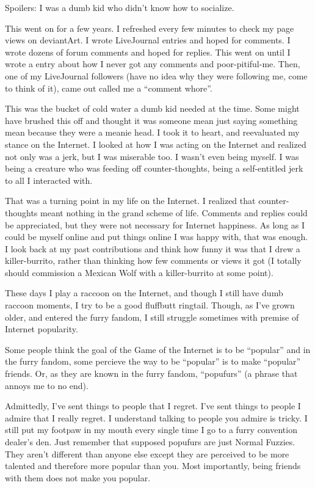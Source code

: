 Spoilers: I was a dumb kid who didn't know how to socialize.

This went on for a few years. I refreshed every few minutes to check my page views on deviantArt.  I wrote LiveJournal entries and hoped for comments. I wrote dozens of forum comments and hoped for replies. This went on until I wrote a entry about how I never got any comments and poor-pitiful-me. Then, one of my LiveJournal followers (have no idea why they were following me, come to think of it), came out called me a ``comment whore''.

This was the bucket of cold water a dumb kid needed at the time. Some might have brushed this off and thought it was someone mean just saying something mean because they were a meanie head. I took it to heart, and reevaluated my stance on the Internet. I looked at how I was acting on the Internet and realized not only was a jerk, but I was miserable too. I wasn't even being myself. I was being a creature who was feeding off counter-thoughts, being a self-entitled jerk to all I interacted with.

That was a turning point in my life on the Internet. I realized that counter-thoughts meant nothing in the grand scheme of life. Comments and replies could be appreciated, but they were not necessary for Internet happiness. As long as I could be myself online and put things online I was happy with, that was enough. I look back at my past contributions and think how funny it was that I drew a killer-burrito, rather than thinking how few comments or views it got (I totally should commission a Mexican Wolf with a killer-burrito at some point).

These days I play a raccoon on the Internet, and though I still have dumb raccoon moments, I try to be a good fluffbutt ringtail. Though, as I've grown older, and entered the furry fandom, I still struggle sometimes with premise of Internet popularity.

Some people think the goal of the Game of the Internet is to be ``popular'' and in the furry fandom, some percieve the way to be ``popular'' is to make ``popular'' friends. Or, as they are known in the furry fandom, ``popufurs'' (a phrase that annoys me to no end).

Admittedly, I've sent things to people that I regret. I've sent things to people I admire that I really regret. I understand talking to people you admire is tricky. I still put my footpaw in my mouth every single time I go to a furry convention dealer's den. Just remember that supposed popufurs are just Normal Fuzzies. They aren't different than anyone else except they are perceived to be more talented and therefore more popular than you. Most importantly, being friends with them does not make you popular.

